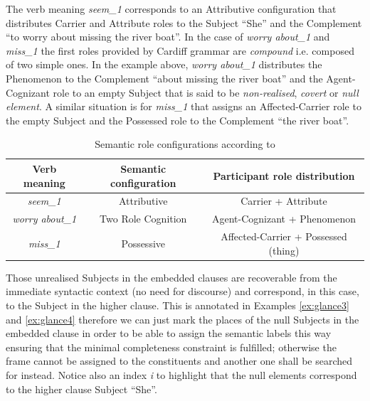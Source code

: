 The verb meaning \textit{seem_{1}} corresponds to an Attributive configuration that distributes Carrier and Attribute roles to the Subject ``She'' and the Complement ``to worry about missing the river boat''. In the case of \textit{worry about_1} and \textit{miss_1} the first roles provided by Cardiff grammar are \textit{compound} i.e. composed of two simple ones. %
In the example above, \textit{worry about_1} distributes the Phenomenon to the Complement ``about missing the river boat'' and the Agent-Cognizant role to an empty Subject that is said to be \textit{non-realised}, \textit{covert} or \textit{null element}. A similar situation is for \textit{miss_1} that assigns an Affected-Carrier role to the empty Subject and the Possessed role to the Complement ``the river boat''. 

\begin{table}[!ht]
    \centering
    \begin{tabulary}{0.95\textwidth}{|c|C|C|}
        \hline
        \textbf{Verb meaning} & \textbf{Semantic configuration} & \textbf{Participant role distribution}  \\ \hline
        \textit{seem_{1}}           & Attributive                     & Carrier + Attribute                     \\ \hline
        \textit{worry about_{1}}   & Two Role Cognition              & Agent-Cognizant + Phenomenon         \\ \hline
        \textit{miss_{1}}           & Possessive                      & Affected-Carrier + Possessed (thing) \\ \hline
    \end{tabulary}
    \caption{Semantic role configurations according to \citet{Neale2002,Fawcett2009}}
    \label{tab:semantic-role-distro}
\end{table}

Those unrealised Subjects in the embedded clauses are recoverable from the immediate syntactic context (no need for discourse) and correspond, in this case, to the Subject in the higher clause. This is annotated in Examples \ref{ex:glance3} and \ref{ex:glance4} therefore we can just mark the places of the null Subjects in the embedded clause in order to be able to assign the semantic labels this way ensuring that the minimal completeness constraint is fulfilled; otherwise the frame cannot be assigned to the constituents and another one shall be searched for instead. Notice also an index \textit{i} to highlight that the null elements correspond to the higher clause Subject ``She''. 

